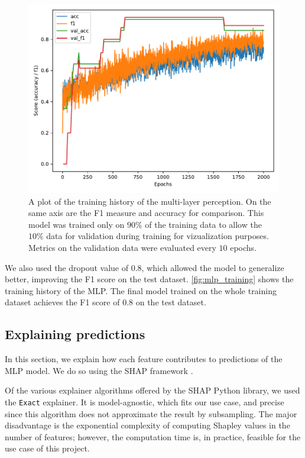 \begin{figure}
    \centering
    \includegraphics[width=1\columnwidth]{images/mlp_training.pdf}
    \caption{A plot of the training history of the multi-layer perception. On the same axis are the F1 measure and accuracy for comparison. This model was trained only on $90\%$ of the training data to allow the $10\%$ data for validation during training for vizualization purposes. Metrics on the validation data were evaluated every $10$ epochs.}
    \label{fig:mlp_training}
\end{figure}

We also used the dropout value of 0.8, which allowed the model to generalize better, improving the F1 score on the test dataset. \autoref{fig:mlp_training} shows the training history of the MLP. The final model trained on the whole training dataset achieves the F1 score of $0.8$ on the test dataset.

\subsection{Explaining predictions}

In this section, we explain how each feature contributes to predictions of the MLP model. We do so using the SHAP framework \cite{lundbergUnifiedApproachInterpreting2017}.

Of the various explainer algorithms offered by the SHAP Python library, we used the \texttt{Exact} explainer. It is model-agnostic, which fits our use case, and precise since this algorithm does not approximate the result by subsampling. The major disadvantage is the exponential complexity of computing Shapley values in the number of features; however, the computation time is, in practice, feasible for the use case of this project.


